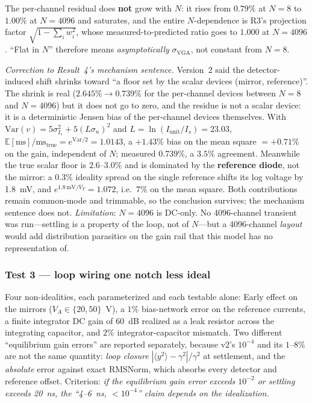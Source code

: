 \documentclass[11pt]{article}
\begin{document}
The per-channel residual does \textbf{not} grow with $N$: it rises from $0.79\%$ at $N=8$ to $1.00\%$ at $N=4096$ and saturates, and the entire $N$-dependence is R3's projection factor $\sqrt{1-\sum_i w_i^2}$, whose measured-to-predicted ratio goes to $1.000$ at $N=4096$. ``Flat in $N$'' therefore means \textit{asymptotically} $\sigma_{\mathrm{VGA}}$, not constant from $N=8$.

\textit{Correction to Result~4's mechanism sentence.} Version~2 said the detector-induced shift shrinks toward ``a floor set by the scalar devices (mirror, reference)''. The shrink is real ($2.645\% \to 0.739\%$ for the per-channel devices between $N=8$ and $N=4096$) but it does not go to zero, and the residue is not a scalar device: it is a deterministic Jensen bias of the per-channel devices themselves. With $\mathrm{Var}(v) = 5\sigma_{I_s}^2 + 5(L\sigma_n)^2$ and $L = \ln(I_{\mathrm{unit}}/I_s) = 23.03$, $\mathbb{E}[\mathrm{ms}]/\mathrm{ms}_{\mathrm{true}} = e^{\mathrm{Var}/2} = 1.0143$, a $+1.43\%$ bias on the mean square $=\mathbf{+0.71\%}$ on the gain, independent of $N$; measured $0.739\%$, a $3.5\%$ agreement. Meanwhile the true scalar floor is $2.6$--$3.0\%$ and is dominated by the \textbf{reference diode}, not the mirror: a $0.3\%$ ideality spread on the single reference shifts its log voltage by 1.8~mV, and $e^{1.8\,\mathrm{mV}/V_T} = 1.072$, i.e.\ $7\%$ on the mean square. Both contributions remain common-mode and trimmable, so the conclusion survives; the mechanism sentence does not. \textit{Limitation}: $N = 4096$ is DC-only. No 4096-channel transient was run---settling is a property of the loop, not of $N$---but a 4096-channel \textit{layout} would add distribution parasitics on the gain rail that this model has no representation of.

\subsubsection{Test 3 --- loop wiring one notch less ideal}

Four non-idealities, each parameterized and each testable alone: Early effect on the mirrors ($V_A \in \{20, 50\}$~V), a $1\%$ bias-network error on the reference currents, a finite integrator DC gain of 60~dB realized as a leak resistor across the integrating capacitor, and $2\%$ integrator-capacitor mismatch. Two different ``equilibrium gain errors'' are reported separately, because v2's $10^{-4}$ and its $1$--$8\%$ are not the same quantity: \textit{loop closure} $|\langle y^2\rangle - \gamma^2|/\gamma^2$ at settlement, and the \textit{absolute} error against exact RMSNorm, which absorbs every detector and reference offset. Criterion: \textit{if the equilibrium gain error exceeds $10^{-2}$ or settling exceeds 20~ns, the ``4--6~ns, $<10^{-4}$'' claim depends on the idealization.}
\end{document}
